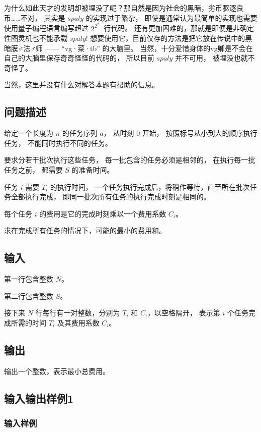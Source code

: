 \documentclass[UTF8]{ctexart}
\begin{document}
为什么如此天才的发明却被埋没了呢？那自然是因为社会的黑暗，劣币驱逐良币……不对， 其实是 $spaly$ 的实现过于繁杂， 即使是通常认为最简单的实现也需要使用量子编程语言编写超过 $2^{2^{2^{\cdots}}}$ 行代码。 还有更加困难的，那就是即便是非确定性图灵机也不能承载 $spaly$! 想要使用它，目前仅存的方法是把它放在传说中的黑暗膜♂法♂师 —— “vg·菜·tb” 的大脑里。 当然，十分爱惜身体的vg卿是不会在自己的大脑里保存奇奇怪怪的代码的， 所以目前 $spaly$ 并不可用， 被埋没也就不奇怪了。

当然，这里并没有什么对解答本题有帮助的信息。

\subsection{问题描述}

给定一个长度为 $n$ 的任务序列 $a$， 从时刻 $0$ 开始， 按照标号从小到大的顺序执行任务， 不能同时执行不同的任务。

要求分若干批次执行这些任务， 每一批包含的任务必须是相邻的， 在执行每一批任务之前， 都需要 $S$ 的准备时间。

任务 $i$ 需要 $T_i$ 的执行时间， 一个任务执行完成后，将稍作等待，直至所在批次任务全部执行完成， 即同一批次所有任务的执行完成时刻是相同的。

每个任务 $i$ 的费用是它的完成时刻乘以一个费用系数 $C_i$。

求在完成所有任务的情况下，可能的最小的费用和。

\subsection{输入} 

第一行包含整数 $N$。

第二行包含整数 $S$。

接下来 $N$ 行每行有一对整数，分别为 $T_i$ 和 $C_i$，以空格隔开， 表示第 $i$ 个任务完成所需的时间 $T_i$ 及其费用系数 $C_i$。

\subsection{输出}

输出一个整数，表示最小总费用。

\subsection{输入输出样例1}

\subsubsection{输入样例}
\end{document}
